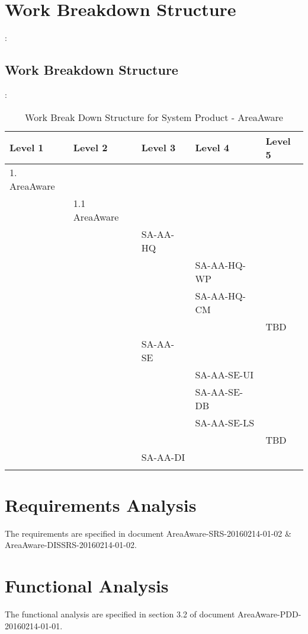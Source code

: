 \section{Work Breakdown Structure}:
\subsection{Work Breakdown Structure}:
\begin{table}[]
\centering
\caption{Work Break Down Structure for System Product - AreaAware}
\label{tab:wbs_sysproduct}
\begin{tabular}{lllll}\hline
Level 1 & Level 2 & Level 3 & Level 4 & Level 5 \\\hline
1. AreaAware   &             &           &             &         \\
            & 1.1 AreaAware  &           &             &         \\
            &                &  SA-AA-HQ &             &         \\
            &                &           & SA-AA-HQ-WP &         \\
            &                &           & SA-AA-HQ-CM &         \\
            &                &           &             & TBD     \\
            &                &  SA-AA-SE &             &         \\
            &                &           & SA-AA-SE-UI &         \\
            &                &           & SA-AA-SE-DB &         \\
            &                &           & SA-AA-SE-LS &         \\
            &                &           &             & TBD     \\
            &                &  SA-AA-DI &             &         \\
            &                &           &             &         \\\hline
\end{tabular}
\end{table}

\section{Requirements Analysis}
The requirements are specified in document AreaAware-SRS-20160214-01-02 \& AreaAware-DISSRS-20160214-01-02.


\section{Functional Analysis}
The functional analysis are specified in section 3.2 of document  AreaAware-PDD-20160214-01-01.


